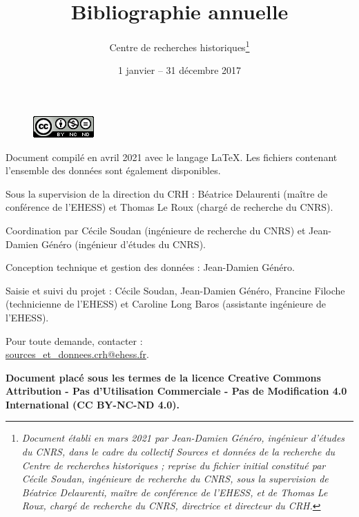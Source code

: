 \documentclass{article}
\title{\textbf{Bibliographie annuelle}}
\author{Centre de recherches historiques\footnote{\textit{Document établi en mars 2021 par Jean-Damien Généro, ingénieur d'études du CNRS, dans le cadre du collectif Sources et données de la recherche du Centre de recherches historiques ; reprise du fichier initial constitué par Cécile Soudan, ingénieure de recherche du CNRS, sous la supervision de Béatrice Delaurenti, maître de conférence de l'EHESS, et de 
Thomas Le Roux, chargé de recherche du CNRS, directrice et directeur du CRH.}}}
\date{1\up{er} janvier -- 31 décembre 2017}
\begin{document}
\renewcommand{\contentsname}{Sommaire}


\newpage
\thispagestyle{empty}

\begin{figure}
    \centering
    \includegraphics{img/licence-cc-icon.png}
    \label{fig:licence}
\end{figure}

\bigskip

\bigskip
\begin{center}
\begin{itshape}

Document compilé en avril 2021 avec le langage \LaTeX. Les fichiers  contenant l'ensemble des données sont également disponibles.

\medskip

Sous la supervision de la direction du CRH : Béatrice Delaurenti (maître de conférence de l'EHESS) et Thomas Le Roux (chargé de recherche du CNRS).

\medskip

Coordination par Cécile Soudan (ingénieure de recherche du CNRS) et Jean-Damien Généro (ingénieur d'études du CNRS).

\medskip

Conception technique et gestion des données : Jean-Damien Généro.

\medskip

Saisie et suivi du projet : Cécile Soudan, Jean-Damien Généro, Francine Filoche (technicienne de l'EHESS) et Caroline Long Baros (assistante ingénieure de l'EHESS).

\medskip

Pour toute demande, contacter :\\\url{sources_et_donnees.crh@ehess.fr}.

\end{itshape}

\bigskip

\bigskip

    \textbf{Document placé sous les termes de la licence Creative Commons Attribution - Pas d'Utilisation Commerciale - Pas de Modification 4.0 International (CC BY-NC-ND 4.0).}
\end{center}
\end{document}
